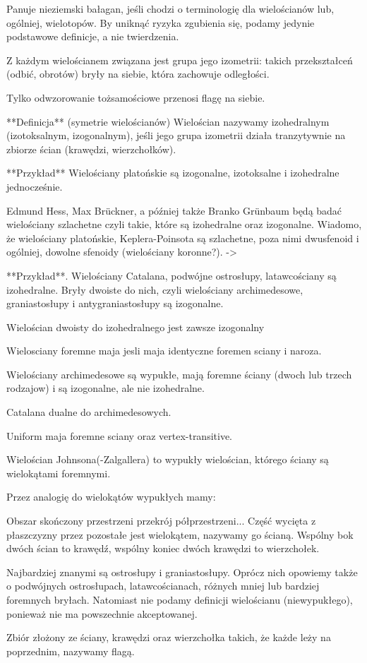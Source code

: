 Panuje nieziemski bałagan, jeśli chodzi o terminologię dla wielościanów lub, ogólniej, wielotopów. By uniknąć ryzyka zgubienia się, podamy jedynie podstawowe definicje, a nie twierdzenia.

Z każdym wielościanem związana jest grupa jego izometrii: takich przekształceń (odbić, obrotów) bryły na siebie, która zachowuje odległości.

Tylko odwzorowanie tożsamościowe przenosi flagę na siebie.

**Definicja** (symetrie wielościanów) Wielościan nazywamy izohedralnym (izotoksalnym, izogonalnym), jeśli jego grupa izometrii działa tranzytywnie na zbiorze ścian (krawędzi, wierzchołków).

**Przykład** Wielościany platońskie są izogonalne, izotoksalne i izohedralne jednocześnie.

Edmund Hess, Max Brückner, a później także Branko Grünbaum będą badać wielościany szlachetne czyli takie, które są izohedralne oraz izogonalne. Wiadomo, że wielościany platońskie, Keplera-Poinsota są szlachetne, poza nimi dwusfenoid i ogólniej, dowolne sfenoidy (wielościany koronne?). -> %

**Przykład**. Wielościany Catalana, podwójne ostrosłupy, latawcościany są izohedralne. Bryły dwoiste do nich, czyli wielościany archimedesowe, graniastosłupy i antygraniastosłupy są izogonalne.

Wielościan dwoisty do izohedralnego jest zawsze izogonalny

Wielosciany foremne maja jesli maja identyczne foremen sciany i naroza.

Wielościany archimedesowe są wypukłe, mają foremne ściany (dwoch lub trzech rodzajow) i są izogonalne, ale nie izohedralne.

Catalana dualne do archimedesowych.

Uniform maja foremne sciany oraz vertex-transitive.

Wielościan Johnsona(-Zalgallera) to wypukły wielościan, którego ściany są wielokątami foremnymi.


Przez analogię do wielokątów wypukłych mamy:

\begin{definition}
    Obszar skończony przestrzeni przekrój półprzestrzeni...
    Część wycięta z płaszczyzny przez pozostałe jest wielokątem, nazywamy go ścianą.
    Wspólny bok dwóch ścian to krawędź, wspólny koniec dwóch krawędzi to wierzchołek.
\end{definition}

Najbardziej znanymi są ostrosłupy i graniastosłupy.
Oprócz nich opowiemy także o podwójnych ostrosłupach, latawcościanach, różnych mniej lub bardziej foremnych bryłach.
Natomiast nie podamy definicji wielościanu (niewypukłego), ponieważ nie ma powszechnie akceptowanej.

\begin{definition}[flaga]
    Zbiór złożony ze ściany, krawędzi oraz wierzchołka takich, że każde leży na poprzednim, nazywamy flagą.
\end{definition} %

